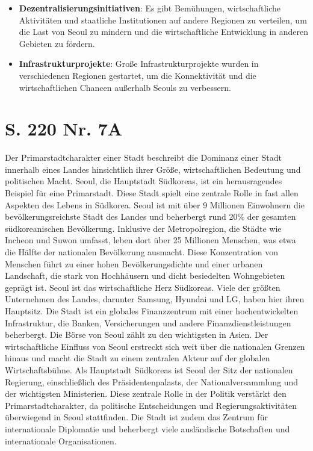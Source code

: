 \documentclass[12pt,a4paper]{report}
\begin{document}
	\begin{itemize}
   	\item \textbf{Dezentralisierungsinitiativen}: Es gibt Bemühungen, wirtschaftliche Aktivitäten und staatliche Institutionen auf andere Regionen zu verteilen, um die Last von Seoul zu mindern und die wirtschaftliche Entwicklung in anderen Gebieten zu fördern.
   	\item \textbf{Infrastrukturprojekte}: Große Infrastrukturprojekte wurden in verschiedenen Regionen gestartet, um die Konnektivität und die wirtschaftlichen Chancen außerhalb Seouls zu verbessern.
	\end{itemize}

	\section{S. 220 Nr. 7A}
	Der Primarstadtcharakter einer Stadt beschreibt die Dominanz einer Stadt innerhalb eines Landes hinsichtlich ihrer Größe, wirtschaftlichen Bedeutung und politischen Macht.
	Seoul, die Hauptstadt Südkoreas, ist ein herausragendes Beispiel für eine Primarstadt. Diese Stadt spielt eine zentrale Rolle in fast allen Aspekten des Lebens in Südkorea.
	Seoul ist mit über 9 Millionen Einwohnern die bevölkerungsreichste Stadt des Landes und beherbergt rund 20\% der gesamten südkoreanischen Bevölkerung.
	Inklusive der Metropolregion, die Städte wie Incheon und Suwon umfasst, leben dort über 25 Millionen Menschen, was etwa die Hälfte der nationalen Bevölkerung ausmacht.
	Diese Konzentration von Menschen führt zu einer hohen Bevölkerungsdichte und einer urbanen Landschaft, die stark von Hochhäusern und dicht besiedelten Wohngebieten geprägt ist.
	Seoul ist das wirtschaftliche Herz Südkoreas. Viele der größten Unternehmen des Landes, darunter Samsung, Hyundai und LG, haben hier ihren Hauptsitz.
	Die Stadt ist ein globales Finanzzentrum mit einer hochentwickelten Infrastruktur, die Banken, Versicherungen und andere Finanzdienstleistungen beherbergt.
	Die Börse von Seoul zählt zu den wichtigsten in Asien. Der wirtschaftliche Einfluss von Seoul erstreckt sich weit über die nationalen Grenzen hinaus und macht die Stadt zu einem zentralen Akteur auf der globalen Wirtschaftsbühne.
	Als Hauptstadt Südkoreas ist Seoul der Sitz der nationalen Regierung, einschließlich des Präsidentenpalasts, der Nationalversammlung und der wichtigsten Ministerien.
	Diese zentrale Rolle in der Politik verstärkt den Primarstadtcharakter, da politische Entscheidungen und Regierungsaktivitäten überwiegend in Seoul stattfinden.
	Die Stadt ist zudem das Zentrum für internationale Diplomatie und beherbergt viele ausländische Botschaften und internationale Organisationen.
\end{document}
